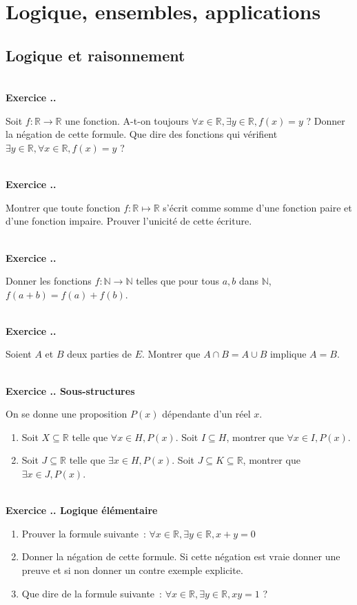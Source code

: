\documentclass{article}
\newcommand{\mb}[1]{\mathbb{#1}}
\newcounter{exo}
\newcommand{\exercice}[1][\null]{\textbf{\\ \large Exercice \thesection.\theexo. \normalsize #1} \addtocounter{exo}{1}}
\begin{document}
\tableofcontents

\pagebreak


\section{Logique, ensembles, applications}

\subsection{Logique et raisonnement}

\exercice 

Soit $f : \mb{R} \rightarrow \mb{R}$ une fonction. A-t-on toujours $\forall x \in \mb{R}, \exists y \in \mb{R}, f(x) = y$ ? Donner la négation de cette formule. Que dire des fonctions qui vérifient $\exists y \in \mb{R}, \forall x \in \mb{R},  f(x) = y$ ?

\exercice  Montrer que toute fonction $f : \mb{R} \mapsto \mb{R}$ s'écrit comme somme d'une fonction paire et d'une fonction impaire. Prouver l'unicité de cette écriture.

\exercice Donner les fonctions $f : \mb{N} \rightarrow \mb{N}$ telles que pour tous $a,b$ dans $\mb{N}$, $f(a+b) = f(a)+f(b)$.

\exercice

Soient $A$ et $B$ deux parties de $E$. Montrer que $A \cap B = A \cup B$ implique $A = B$.

\exercice[Sous-structures]

On se donne une proposition $P(x)$ dépendante d'un réel $x$.

\begin{enumerate}

\item Soit $X \subseteq \mb{R}$ telle que $\forall x \in H, P(x)$. Soit $I \subseteq H$, montrer que $\forall x \in I, P(x)$.

\item Soit $J \subseteq \mb{R}$ telle que $\exists x \in H, P(x)$. Soit $J \subseteq K \subseteq \mb{R}$, montrer que $\exists x \in J, P(x)$.
\end{enumerate}

\exercice[Logique élémentaire]

\begin{enumerate}
    \item Prouver la formule suivante~: $\forall x \in \mathbb{R}, \exists y \in
        \mathbb{R}, x + y = 0$

    \item Donner la négation de cette formule. Si cette négation est vraie
        donner une preuve et si non donner un contre exemple explicite.

    \item Que dire de la formule suivante~: $\forall x \in \mathbb{R}, \exists y \in
        \mathbb{R}, xy = 1$ ?
\end{enumerate}
\end{document}
